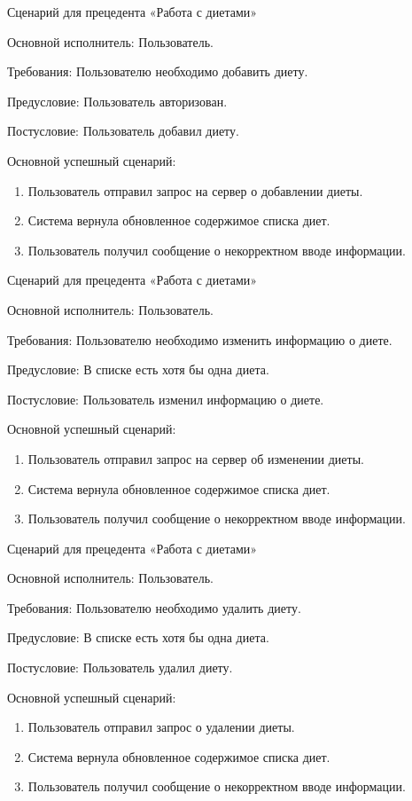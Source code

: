 Сценарий для прецедента «Работа с диетами»

Основной исполнитель: Пользователь.

Требования: Пользователю необходимо добавить диету.

Предусловие: Пользователь авторизован.

Постусловие: Пользователь добавил диету.

Основной успешный сценарий:
\begin{enumerate}
	\item Пользователь отправил запрос на сервер о добавлении диеты.
	\item Система вернула обновленное содержимое списка диет.
	\item Пользователь получил сообщение о некорректном вводе информации.\\
\end{enumerate}

Сценарий для прецедента «Работа с диетами»

Основной исполнитель: Пользователь.

Требования: Пользователю необходимо изменить информацию о диете.

Предусловие: В списке есть хотя бы одна диета.

Постусловие: Пользователь изменил информацию о диете.

Основной успешный сценарий:
\begin{enumerate}
	\item Пользователь отправил запрос на сервер об изменении диеты.
	\item Система вернула обновленное содержимое списка диет.
	\item Пользователь получил сообщение о некорректном вводе информации.\\
\end{enumerate}

Сценарий для прецедента «Работа с диетами»

Основной исполнитель: Пользователь.

Требования: Пользователю необходимо удалить диету.

Предусловие: В списке есть хотя бы одна диета.

Постусловие: Пользователь удалил диету.

Основной успешный сценарий:
\begin{enumerate}
	\item Пользователь отправил запрос о удалении диеты.
	\item Система вернула обновленное содержимое списка диет.
	\item Пользователь получил сообщение о некорректном вводе информации.\\
\end{enumerate}


